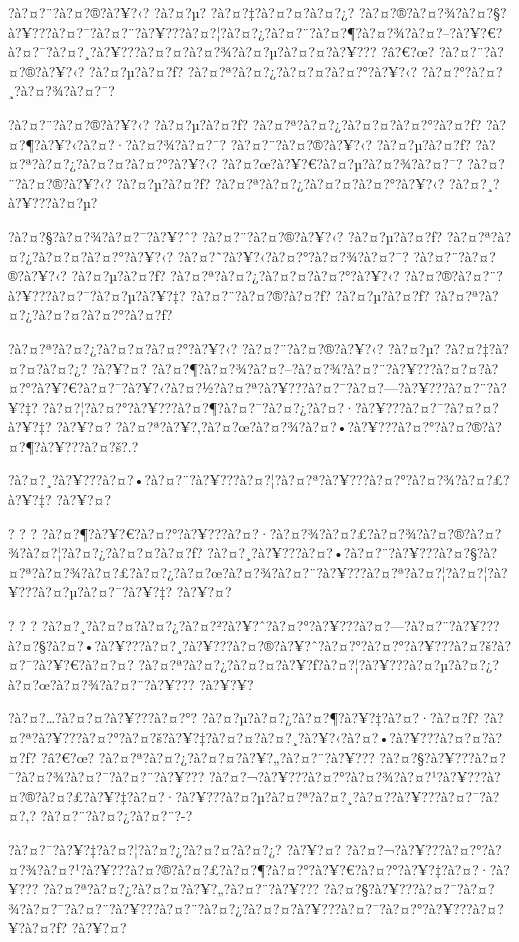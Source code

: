 \documentclass[11pt, openany]{book}
\begin{document}
{{{{{{{{{{{{{{{?à?¤?¨?à?¤?®?à?¥?‹? ?à?¤?µ? ?à?¤?‡?à?¤?¤?à?¤?¿?
?à?¤?®?à?¤?¾?à?¤?§?à?¥???à?¤?¯?à?¤?¨?à?¥???à?¤?¦?à?¤?¿?à?¤?¨?à?¤?¶?à?¤?¾?à?¤?--?à?¥?€?à?¤?¯?à?¤?¸?à?¥???à?¤?¤?à?¤?¾?à?¤?µ?à?¤?¤?à?¥???
?â?€?œ? ?à?¤?¨?à?¤?®?à?¥?‹? ?à?¤?µ?à?¤?ƒ?
?à?¤?ª?à?¤?¿?à?¤?¤?à?¤?°?à?¥?‹? ?à?¤?°?à?¤?¸?à?¤?¾?à?¤?¯?

?à?¤?¨?à?¤?®?à?¥?‹? ?à?¤?µ?à?¤?ƒ? ?à?¤?ª?à?¤?¿?à?¤?¤?à?¤?°?à?¤?ƒ?
?à?¤?¶?à?¥?‹?à?¤?·?à?¤?¾?à?¤?¯? ?à?¤?¨?à?¤?®?à?¥?‹? ?à?¤?µ?à?¤?ƒ?
?à?¤?ª?à?¤?¿?à?¤?¤?à?¤?°?à?¥?‹? ?à?¤?œ?à?¥?€?à?¤?µ?à?¤?¾?à?¤?¯?
?à?¤?¨?à?¤?®?à?¥?‹? ?à?¤?µ?à?¤?ƒ? ?à?¤?ª?à?¤?¿?à?¤?¤?à?¤?°?à?¥?‹?
?à?¤?¸?à?¥???à?¤?µ?

?à?¤?§?à?¤?¾?à?¤?¯?à?¥?ˆ? ?à?¤?¨?à?¤?®?à?¥?‹? ?à?¤?µ?à?¤?ƒ?
?à?¤?ª?à?¤?¿?à?¤?¤?à?¤?°?à?¥?‹? ?à?¤?˜?à?¥?‹?à?¤?°?à?¤?¾?à?¤?¯?
?à?¤?¨?à?¤?®?à?¥?‹? ?à?¤?µ?à?¤?ƒ? ?à?¤?ª?à?¤?¿?à?¤?¤?à?¤?°?à?¥?‹?
?à?¤?®?à?¤?¨?à?¥???à?¤?¯?à?¤?µ?à?¥?‡? ?à?¤?¨?à?¤?®?à?¤?ƒ? ?à?¤?µ?à?¤?ƒ?
?à?¤?ª?à?¤?¿?à?¤?¤?à?¤?°?à?¤?ƒ?

?à?¤?ª?à?¤?¿?à?¤?¤?à?¤?°?à?¥?‹? ?à?¤?¨?à?¤?®?à?¥?‹? ?à?¤?µ?
?à?¤?‡?à?¤?¤?à?¤?¿? ?à?¥?¤?
?à?¤?¶?à?¤?¾?à?¤?--?à?¤?¾?à?¤?¨?à?¥???à?¤?¤?à?¤?°?à?¥?€?à?¤?¯?à?¥?‹?à?¤?½?à?¤?ª?à?¥???à?¤?¯?à?¤?---?à?¥???à?¤?¨?à?¥?‡?
?à?¤?¦?à?¤?°?à?¥???à?¤?¶?à?¤?¯?à?¤?¿?à?¤?·?à?¥???à?¤?¯?à?¤?¤?à?¥?‡?
?à?¥?¤?
?à?¤?ª?à?¥?‚?à?¤?œ?à?¤?¾?à?¤?•?à?¥???à?¤?°?à?¤?®?à?¤?¶?à?¥???à?¤?š?.?

?à?¤?¸?à?¥???à?¤?•?à?¤?¨?à?¥???à?¤?¦?à?¤?ª?à?¥???à?¤?°?à?¤?¾?à?¤?£?à?¥?‡?
?à?¥?¤?

? ? ?
?à?¤?¶?à?¥?€?à?¤?°?à?¥???à?¤?·?à?¤?¾?à?¤?£?à?¤?¾?à?¤?®?à?¤?¾?à?¤?¦?à?¤?¿?à?¤?¤?à?¤?ƒ?
?à?¤?¸?à?¥???à?¤?•?à?¤?¨?à?¥???à?¤?§?à?¤?ª?à?¤?¾?à?¤?£?à?¤?¿?à?¤?œ?à?¤?¾?à?¤?¨?à?¥???à?¤?ª?à?¤?¦?à?¤?¦?à?¥???à?¤?µ?à?¤?¯?à?¥?‡?
?à?¥?¤?

? ? ?
?à?¤?¸?à?¤?¤?à?¤?¿?à?¤?²?à?¥?ˆ?à?¤?°?à?¥???à?¤?---?à?¤?¨?à?¥???à?¤?§?à?¤?•?à?¥???à?¤?¸?à?¥???à?¤?®?à?¥?ˆ?à?¤?°?à?¤?°?à?¥???à?¤?š?à?¤?¯?à?¥?€?à?¤?¤?
?à?¤?ª?à?¤?¿?à?¤?¤?à?¥?ƒ?à?¤?¦?à?¥???à?¤?µ?à?¤?¿?à?¤?œ?à?¤?¾?à?¤?¨?à?¥???
?à?¥?¥?

?à?¤?\ldots{}?à?¤?¤?à?¥???à?¤?°? ?à?¤?µ?à?¤?¿?à?¤?¶?à?¥?‡?à?¤?·?à?¤?ƒ?
?à?¤?ª?à?¥???à?¤?°?à?¤?š?à?¥?‡?à?¤?¤?à?¤?¸?à?¥?‹?à?¤?•?à?¥???à?¤?¤?à?¤?ƒ?
?â?€?œ? ?à?¤?ª?à?¤?¿?à?¤?¤?à?¥?„?à?¤?¨?à?¥???
?à?¤?§?à?¥???à?¤?¯?à?¤?¾?à?¤?¯?à?¤?¨?à?¥???
?à?¤?¬?à?¥???à?¤?°?à?¤?¾?à?¤?¹?à?¥???à?¤?®?à?¤?£?à?¥?‡?à?¤?·?à?¥???à?¤?µ?à?¤?ª?à?¤?¸?à?¤?­?à?¥???à?¤?¯?à?¤?‚?
?à?¤?¨?à?¤?¿?à?¤?¨?-?

?à?¤?¯?à?¥?‡?à?¤?¦?à?¤?¿?à?¤?¤?à?¤?¿? ?à?¥?¤?
?à?¤?¬?à?¥???à?¤?°?à?¤?¾?à?¤?¹?à?¥???à?¤?®?à?¤?£?à?¤?¶?à?¤?°?à?¥?€?à?¤?°?à?¥?‡?à?¤?·?à?¥???
?à?¤?ª?à?¤?¿?à?¤?¤?à?¥?„?à?¤?¨?à?¥???
?à?¤?§?à?¥???à?¤?¯?à?¤?¾?à?¤?¯?à?¤?¨?à?¥???à?¤?¨?à?¤?¿?à?¤?¤?à?¥???à?¤?¯?à?¤?°?à?¥???à?¤?¥?à?¤?ƒ?
?à?¥?¤?

}}}}}}}}}}}}}}}
\end{document}
